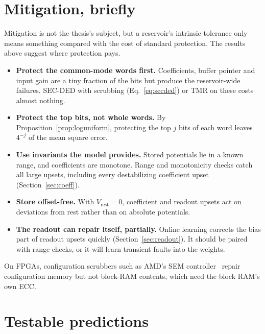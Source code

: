 \documentclass[11pt,a4paper]{article}
\begin{document}
\section{Mitigation, briefly}
\label{sec:mitigation}

Mitigation is not the thesis's subject, but a reservoir's intrinsic tolerance only means something compared with the cost of standard protection. The results above suggest where protection pays.
\begin{itemize}
  \item \textbf{Protect the common-mode words first.} Coefficients, buffer pointer and input gain are a tiny fraction of the bits but produce the reservoir-wide failures. SEC-DED with scrubbing (Eq.~\eqref{eq:secded}) or TMR on these costs almost nothing.
  \item \textbf{Protect the top bits, not whole words.} By Proposition~\ref{prop:loguniform}, protecting the top $j$ bits of each word leaves $4^{-j}$ of the mean square error.
  \item \textbf{Use invariants the model provides.} Stored potentials lie in a known range, and coefficients are monotone. Range and monotonicity checks catch all large upsets, including every destabilizing coefficient upset (Section~\ref{sec:coeff}).
  \item \textbf{Store offset-free.} With $V_{\mathrm{rest}} = 0$, coefficient and readout upsets act on deviations from rest rather than on absolute potentials.
  \item \textbf{The readout can repair itself, partially.} Online learning corrects the bias part of readout upsets quickly (Section~\ref{sec:readout}). It should be paired with range checks, or it will learn transient faults into the weights.
\end{itemize}
On FPGAs, configuration scrubbers such as AMD's SEM controller~\cite{amd_sem} repair configuration memory but not block-RAM contents, which need the block RAM's own ECC.

\section{Testable predictions}
\end{document}
